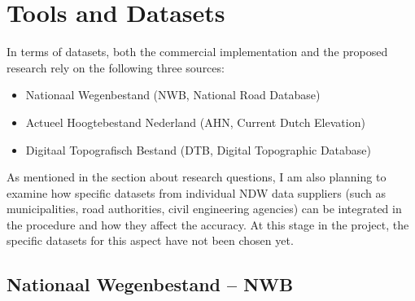 
\section{Tools and Datasets}
\label{sec:td}

In terms of datasets, both the commercial implementation and the proposed research rely on the following three sources:

\begin{itemize}
\item Nationaal Wegenbestand (NWB, National Road Database)
\item Actueel Hoogtebestand Nederland (AHN, Current Dutch Elevation)
\item Digitaal Topografisch Bestand (DTB, Digital Topographic Database)
\end{itemize}

As mentioned in the section about research questions, I am also planning to examine how specific datasets from individual NDW data suppliers (such as municipalities, road authorities, civil engineering agencies) can be integrated in the procedure and how they affect the accuracy. At this stage in the project, the specific datasets for this aspect have not been chosen yet.

\subsection{Nationaal Wegenbestand – NWB}
\label{sub:nwb}

